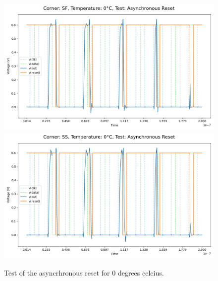 \begin{figure}[H]
    \vspace{5pt}
    \includegraphics[height= 0.21\textheight]{figures/aimspice/SF/0/W2.csv.png}
    \vspace{5pt}
    \includegraphics[height= 0.21\textheight]{figures/aimspice/SS/0/W2.csv.png}
    \caption{Test of the asyncrhronous reset for 0 degrees celcius.}
    \label{fig:aimspice_W2_0}
\end{figure}

\pagebreak

